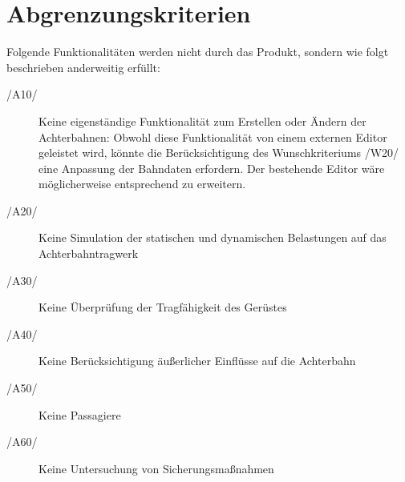 \section{Abgrenzungskriterien}
Folgende Funktionalitäten werden nicht durch das Produkt, sondern wie folgt
beschrieben anderweitig erfüllt:
\begin{description}
	\item[/A10/] Keine eigenständige Funktionalität zum Erstellen oder Ändern der Achterbahnen: Obwohl diese Funktionalität von einem externen Editor geleistet wird, könnte die Berücksichtigung
		     des Wunschkriteriums /W20/ eine Anpassung der Bahndaten erfordern. Der bestehende Editor wäre möglicherweise entsprechend zu erweitern.
	\item[/A20/] Keine Simulation der statischen und dynamischen Belastungen auf das Achterbahntragwerk
	\item[/A30/] Keine Überprüfung der Tragfähigkeit des Gerüstes
	\item[/A40/] Keine Berücksichtigung äußerlicher Einflüsse auf die Achterbahn
	\item[/A50/] Keine Passagiere
	\item[/A60/] Keine Untersuchung von Sicherungsmaßnahmen
\end{description}
